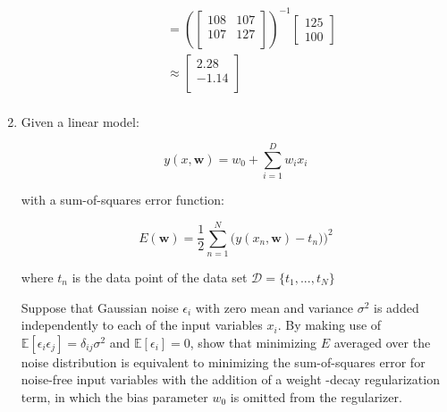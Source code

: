 \documentclass[12pt, a4paper]{article}
\begin{document}
\begin{enumerate}
\begin{enumerate}
\begin{align*}
        &= (\begin{bmatrix}108&107\\107&127\\\end{bmatrix})^{-1}\begin{bmatrix}125\\100\end{bmatrix}\\
        &\approx \begin{bmatrix}2.28\\-1.14\\\end{bmatrix}\\
    \end{align*}

\end{enumerate}

\item Given a linear model:

$$ y(x, \mathbf w) = w_0 + \sum_{i=1}^{D}w_ix_i$$

with a sum-of-squares error function:

$$E(\mathbf w) = \frac 1 2 \sum_{n=1}^{N} \big(y(x_n, \mathbf w) -t_n ) \big)^2 $$

where $t_n$ is the data point of the data set $\mathcal D=\{t_1, ...,t_N \}$

Suppose that Gaussian noise $\epsilon_i$ with zero mean and variance $\sigma^2$ is added independently to each of the input variables $x_i$.
By making use of $\mathbb E[\epsilon_i \epsilon_j] = \delta_{ij} \sigma^2$ and $\mathbb E[\epsilon_i] = 0$, show that minimizing $E$ averaged over the noise distribution is equivalent to minimizing the sum-of-squares error for noise-free input variables with the addition of a weight -decay regularization term, in which the bias parameter $w_0$ is omitted from the regularizer.\\


\end{enumerate}
\end{document}
